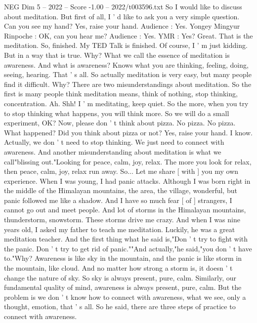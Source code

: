 \begin{textsample}{NEG Dim 5 – 2022 – Score -1.00 – 2022/t003596.txt}  \label{ex:f5_neg_035}
So I would like to discuss about meditation.
But first of all, I ' d like to ask you a very simple question.
Can you see my hand?
Yes, raise your hand.
Audience : Yes.
Yongey Mingyur Rinpoche : OK, can you hear me?
Audience : Yes.
YMR : Yes?
Great.
That is the meditation.
So, finished.
My TED Talk is finished.
Of course, I ' m just kidding.
But in a way that is true.
Why?
What we call the essence of meditation is awareness.
And what is awareness?
Knows what you are thinking, feeling, doing, seeing, hearing.
That ' s all.
So actually meditation is very easy, but many people find it difficult.
Why?
There are two misunderstandings about meditation.
So the first is many people think meditation means, think of nothing, stop thinking, concentration.
Ah.
Shh!
I ' m meditating, keep quiet.
So the more, when you try to stop thinking what happens, you will think more.
So we will do a small experiment, OK?
Now, please don ' t think about pizza.
No pizza.
No pizza.
What happened?
Did you think about pizza or not?
Yes, raise your hand.
I know.
Actually, we don ' t need to stop thinking.
We just need to connect with awareness.
And another misunderstanding about meditation is what we call"blissing out."Looking for peace, calm, joy, relax.
The more you look for relax, then peace, calm, joy, relax run away.
So...
Let me share [ with ] you my own experience.
When I was young, I had panic attacks.
Although I was born right in the middle of the Himalayan mountains, the area, the village, wonderful, but panic followed me like a shadow.
And I have so much fear [ of ] strangers, I cannot go out and meet people.
And lot of storms in the Himalayan mountains, thunderstorm, snowstorm.
These storms drive me crazy.
And when I was nine years old, I asked my father to teach me meditation.
Luckily, he was a great meditation teacher.
And the first thing what he said is,"Don ' t try to fight with the panic.
Don ' t try to get rid of panic.""And actually,"he said,"you don ' t have to."Why?
Awareness is like sky in the mountain, and the panic is like storm in the mountain, like cloud.
And no matter how strong a storm is, it doesn ' t change the nature of sky.
So sky is always present, pure, calm.
Similarly, our fundamental quality of mind, awareness is always present, pure, calm.
But the problem is we don ' t know how to connect with awareness, what we see, only a thought, emotion, that ' s all.
So he said, there are three steps of practice to connect with awareness.

\end{textsample}
